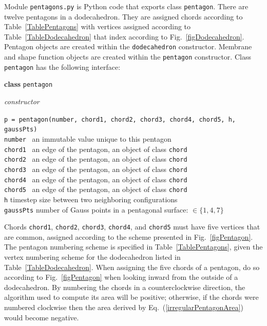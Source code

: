 Module \texttt{pentagons.py} is Python code that exports class \texttt{pentagon}.  There are twelve pentagons in a dodecahedron.  They are assigned chords according to Table~\ref{TablePentagons} with vertices assigned according to Table~\ref{TableDodecahedron} that index according to Fig.~\ref{figDodecahedron}.  Pentagon objects are created within the \texttt{dodecahedron} constructor.  Membrane and shape function objects are created within the \texttt{pentagon} constructor.  Class \texttt{pentagon} has the following interface:

\bigskip\noindent
\textbf{class} \texttt{pentagon}

\medskip\noindent
\textit{constructor}

\medskip\noindent\small
\texttt{p = pentagon(number, chord1, chord2, chord3, chord4, chord5, h, gaussPts)} \\
\normalsize
\indent \texttt{number} \;\;\;\;\, an immutable value unique to this pentagon \\
\indent \texttt{chord1} \;\;\;\;\, an edge of the pentagon, an object of class \texttt{chord} \\
\indent \texttt{chord2} \;\;\;\;\, an edge of the pentagon, an object of class \texttt{chord} \\
\indent \texttt{chord3} \;\;\;\;\, an edge of the pentagon, an object of class \texttt{chord} \\
\indent \texttt{chord4} \;\;\;\;\, an edge of the pentagon, an object of class \texttt{chord} \\
\indent \texttt{chord5} \;\;\;\;\, an edge of the pentagon, an object of class \texttt{chord} \\
\indent \texttt{h} \qquad\qquad\hspace{0pt} timestep size between two neighboring configurations \\
\indent \texttt{gaussPts} \; number of Gauss points in a pentagonal surface: $\in \{ 1 , 4, 7 \}$

\medskip\noindent
Chords \texttt{chord1}, \texttt{chord2}, \texttt{chord3}, \texttt{chord4}, and \texttt{chord5} must have five vertices that are common, assigned according to the scheme presented in Fig.~\ref{figPentagon}.  The pentagon numbering scheme is specified in Table~\ref{TablePentagons}, given the vertex numbering scheme for the dodecahedron listed in Table~\ref{TableDodecahedron}.  When assigning the five chords of a pentagon, do so according to Fig.~\ref{figPentagon} when looking inward from the outside of a dodecahedron.  By numbering the chords in a counter\-clockwise direction, the algorithm used to compute its area will be positive; otherwise, if the chords were numbered clockwise then the area derived by Eq.~(\ref{irregularPentagonArea}) would become negative.

